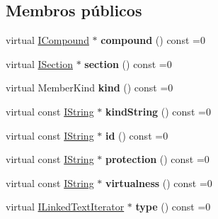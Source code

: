 \subsection*{Membros públicos}
\begin{DoxyCompactItemize}
\item 
\hypertarget{class_i_member_aa6da37037d5aeb4945ada6a9a8f4ce0e}{virtual \hyperlink{class_i_compound}{I\-Compound} $\ast$ {\bfseries compound} () const =0}\label{class_i_member_aa6da37037d5aeb4945ada6a9a8f4ce0e}

\item 
\hypertarget{class_i_member_a1341a30d5dbc93faead9c8290fdf9c5f}{virtual \hyperlink{class_i_section}{I\-Section} $\ast$ {\bfseries section} () const =0}\label{class_i_member_a1341a30d5dbc93faead9c8290fdf9c5f}

\item 
\hypertarget{class_i_member_a1e16eda229a3778eaa7c76032a3ee4c6}{virtual Member\-Kind {\bfseries kind} () const =0}\label{class_i_member_a1e16eda229a3778eaa7c76032a3ee4c6}

\item 
\hypertarget{class_i_member_a872363e5be82229a73bd00d212a703ce}{virtual const \hyperlink{class_i_string}{I\-String} $\ast$ {\bfseries kind\-String} () const =0}\label{class_i_member_a872363e5be82229a73bd00d212a703ce}

\item 
\hypertarget{class_i_member_aaba28daa272dce8bc14dde330d5b0126}{virtual const \hyperlink{class_i_string}{I\-String} $\ast$ {\bfseries id} () const =0}\label{class_i_member_aaba28daa272dce8bc14dde330d5b0126}

\item 
\hypertarget{class_i_member_a5dc0cca2aef85806942cccf37d73c47b}{virtual const \hyperlink{class_i_string}{I\-String} $\ast$ {\bfseries protection} () const =0}\label{class_i_member_a5dc0cca2aef85806942cccf37d73c47b}

\item 
\hypertarget{class_i_member_a31a31d651b7fb29db639dd1da1148bae}{virtual const \hyperlink{class_i_string}{I\-String} $\ast$ {\bfseries virtualness} () const =0}\label{class_i_member_a31a31d651b7fb29db639dd1da1148bae}

\item 
\hypertarget{class_i_member_a5b2b394697f0afec4166e6342738dfab}{virtual \hyperlink{class_i_linked_text_iterator}{I\-Linked\-Text\-Iterator} $\ast$ {\bfseries type} () const =0}\label{class_i_member_a5b2b394697f0afec4166e6342738dfab}


\end{DoxyCompactItemize}

